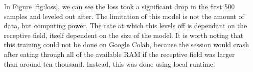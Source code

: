 In Figure \ref{fig:loss}, we can see the loss took a significant drop in the first 500 samples and leveled out after. The limitation of this model is not the amount of data, but computing power. The rate at which this levels off is dependant on the receptive field, itself dependent on the size of the model. It is worth noting that this training could not be done on Google Colab, because the session would crash after eating through all of the available RAM if the receptive field was larger than around ten thousand. Instead, this was done using local runtime.
